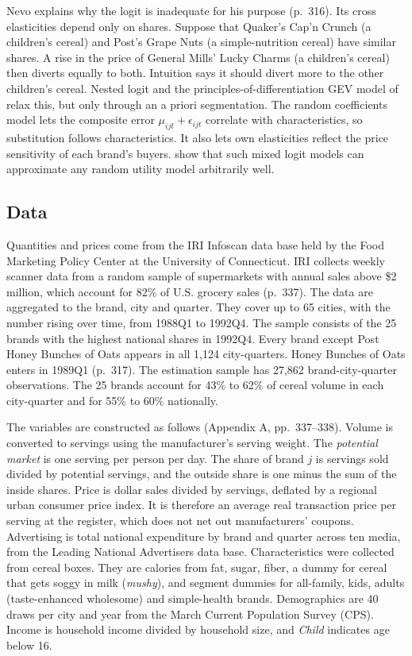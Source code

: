 Nevo explains why the logit is inadequate for his purpose (p.~316). Its cross elasticities depend only on
shares. Suppose that Quaker's Cap'n Crunch (a children's cereal) and Post's Grape Nuts (a simple-nutrition cereal)
have similar shares. A rise in the price of General Mills' Lucky Charms (a children's cereal) then diverts
equally to both. Intuition says it should divert more to the other children's cereal. Nested logit and the principles-of-differentiation GEV
model of \citet{BresnahanSternTrajtenberg1997} relax this, but only through an a priori segmentation. The random
coefficients model lets the composite error $\mu_{ijt} + \epsilon_{ijt}$ correlate with characteristics, so
substitution follows characteristics. It also lets own elasticities reflect the price sensitivity of each
brand's buyers. \citet{McFaddenTrain2000} show that such mixed logit models can approximate any random utility
model arbitrarily well.

\subsection{Data}\label{sec:08-nevo01-data}

Quantities and prices come from the IRI Infoscan data base held by the Food Marketing Policy Center at the
University of Connecticut. IRI collects weekly scanner data from a random sample of supermarkets with annual
sales above \$2 million, which account for 82\% of U.S. grocery sales (p.~337). The data are aggregated to the
brand, city and quarter. They cover up to 65 cities, with the number rising over time, from 1988Q1 to 1992Q4.
The sample consists of the 25 brands with the highest national shares in 1992Q4. Every brand except Post Honey
Bunches of Oats appears in all 1,124 city-quarters. Honey Bunches of Oats enters in 1989Q1 (p.~317). The
estimation sample has 27,862 brand-city-quarter observations. The 25 brands account for 43\% to 62\% of cereal
volume in each city-quarter and for 55\% to 60\% nationally.

The variables are constructed as follows (Appendix A, pp.~337--338). Volume is converted to servings using the
manufacturer's serving weight. The \emph{potential market} is one serving per person per day. The share of
brand $j$ is servings sold divided by potential servings, and the outside share is one minus the sum of the
inside shares. Price is dollar sales divided by servings, deflated by a regional urban consumer price index. It
is therefore an average real transaction price per serving at the register, which does not net out
manufacturers' coupons. Advertising is total national expenditure by brand and quarter across ten media, from
the Leading National Advertisers data base. Characteristics were collected from cereal boxes. They are
calories from fat, sugar, fiber, a dummy for cereal that gets soggy in milk (\emph{mushy}), and segment dummies
for all-family, kids, adults (taste-enhanced wholesome) and simple-health brands. Demographics are 40 draws per
city and year from the March Current Population Survey (CPS). Income is household income divided by household
size, and \emph{Child} indicates age below 16.

